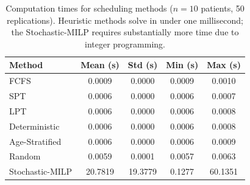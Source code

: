 \begin{table}[H]
\centering
\caption{Computation times for scheduling methods ($n = 10$ patients, 50 replications). Heuristic methods solve in under one millisecond; the Stochastic-MILP requires substantially more time due to integer programming.}
\label{tab:computation_times}
\begin{tabular}{lcccc}
\toprule
Method & Mean (s) & Std (s) & Min (s) & Max (s) \\
\midrule
FCFS & 0.0009 & 0.0000 & 0.0009 & 0.0010 \\
SPT & 0.0006 & 0.0000 & 0.0006 & 0.0007 \\
LPT & 0.0006 & 0.0000 & 0.0006 & 0.0008 \\
Deterministic & 0.0006 & 0.0000 & 0.0006 & 0.0008 \\
Age-Stratified & 0.0006 & 0.0000 & 0.0006 & 0.0009 \\
Random & 0.0059 & 0.0001 & 0.0057 & 0.0063 \\
Stochastic-MILP & 20.7819 & 19.3779 & 0.1277 & 60.1351 \\
\bottomrule
\end{tabular}
\end{table}